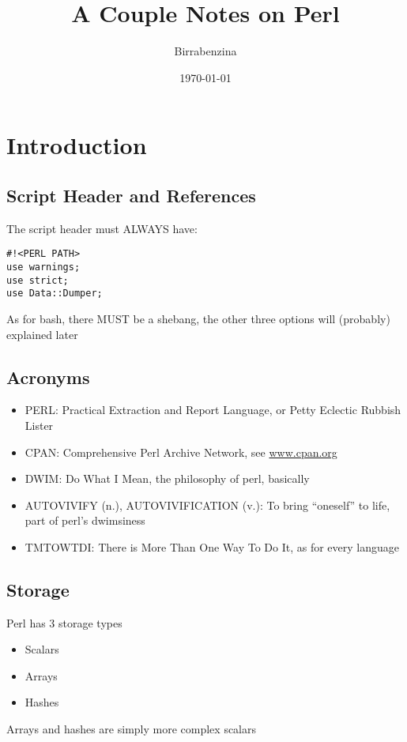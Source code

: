 \documentclass{article}
\title{A Couple Notes on Perl}
\author{Birrabenzina}
\date{\today}
\begin{document}
\maketitle
\tableofcontents
\newpage
\section{Introduction}
\subsection{Script Header and References}
The script header must ALWAYS have:
\begin{verbatim}
#!<PERL PATH>
use warnings;
use strict;
use Data::Dumper;
\end{verbatim}
As for bash, there MUST be a shebang, the other three options will (probably) explained later
\subsection{Acronyms}
\begin{itemize}
\item PERL: Practical Extraction and Report Language, or Petty Eclectic Rubbish Lister
\item CPAN: Comprehensive Perl Archive Network, see \url{www.cpan.org}
\item DWIM: Do What I Mean, the philosophy of perl, basically
\item AUTOVIVIFY (n.), AUTOVIVIFICATION (v.): To bring ``oneself'' to life, part of perl's dwimsiness
\item TMTOWTDI: There is More Than One Way To Do It, as for every language
\end{itemize}
\subsection{Storage}
Perl has 3 storage types
\begin{itemize}
\item Scalars
\item Arrays
\item Hashes
\end{itemize}
Arrays and hashes are simply more complex scalars
\end{document}
